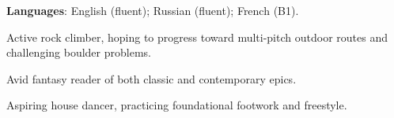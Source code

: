 \begin{zitemize}
    \setlength\itemsep{0.4em}
    \item \textbf{Languages}: English (fluent); Russian (fluent); French (B1).
    \item Active rock climber, hoping to progress toward multi-pitch outdoor routes and challenging boulder problems.
    \item Avid fantasy reader of both classic and contemporary epics.
    \item Aspiring house dancer, practicing foundational footwork and freestyle.
\end{zitemize}